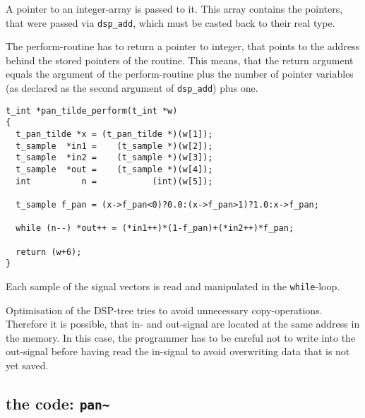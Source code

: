 \documentclass[12pt, a4paper,english,titlepage]{article}
\begin{document}
A pointer to an integer-array is passed to it.
This array contains the pointers, that were passed via \verb+dsp_add+,
which must be casted back to their real type.

The perform-routine has to return a pointer to integer,
that points to the address behind the stored pointers of the routine.
This means, that the return argument equals the
argument of the perform-routine plus
the number of pointer variables (as declared as the second argument
of \verb+dsp_add+) plus one.

\begin{verbatim}
t_int *pan_tilde_perform(t_int *w)
{
  t_pan_tilde *x = (t_pan_tilde *)(w[1]);
  t_sample  *in1 =    (t_sample *)(w[2]);
  t_sample  *in2 =    (t_sample *)(w[3]);
  t_sample  *out =    (t_sample *)(w[4]);
  int          n =           (int)(w[5]);

  t_sample f_pan = (x->f_pan<0)?0.0:(x->f_pan>1)?1.0:x->f_pan;

  while (n--) *out++ = (*in1++)*(1-f_pan)+(*in2++)*f_pan;

  return (w+6);
}
\end{verbatim}

Each sample of the signal vectors is read and manipulated in the \verb+while+-loop.


Optimisation of the DSP-tree tries to avoid unnecessary copy-operations.
Therefore it is possible, that in- and out-signal are located
at the same address in the memory.
In this case, the programmer has to be careful not to write into the out-signal
before having read the in-signal to avoid overwriting data that is not yet saved.

\subsection{the code: \tt pan\~\/}
\end{document}
